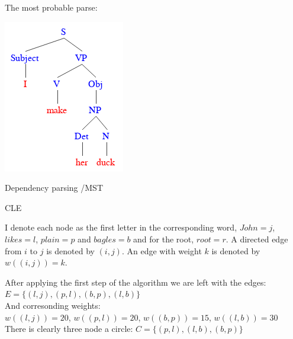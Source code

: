 \documentclass[12pt]{article}
\newenvironment{question}[2][Question]{\begin{trivlist}
\item[\hskip \labelsep {\bfseries #1}\hskip \labelsep {\bfseries #2.}]}{\end{trivlist}}
\newenvironment{answer}[2][Answer]{\begin{trivlist}
\item[\hskip \labelsep {\bfseries #1}\hskip \labelsep {\bfseries #2:}]}{\end{trivlist}}
\begin{document}
\begin{answer}{a)}
\end{answer}
\begin{answer}{b)}

  The most probable parse:

  \includegraphics[scale=0.5]{tree}

\end{answer}

\begin{question}{3}
Dependency parsing /MST
\end{question}

\begin{answer}{a)}{CLE}

I denote each node as the first letter in the corresponding word, $John=j$, $likes=l$, $plain=p$ and $bagles=b$ and for the root, $root=r$. A directed edge from $i$ to $j$ is denoted by $(i,j)$. An edge with weight $k$ is denoted by $w((i,j))=k$.

After applying the first step of the algorithm we are left with the edges:\\
$E=\{(l,j),(p,l),(b,p),(l,b)\}$ \\
And corresonding weights: \\
$w((l,j))=20$, $w((p,l))=20$, $w((b,p))=15$, $w((l,b))=30$ \\
There is clearly three node a circle: $C=\{(p,l),(l,b),(b,p)\}$
\end{answer}
\end{document}
